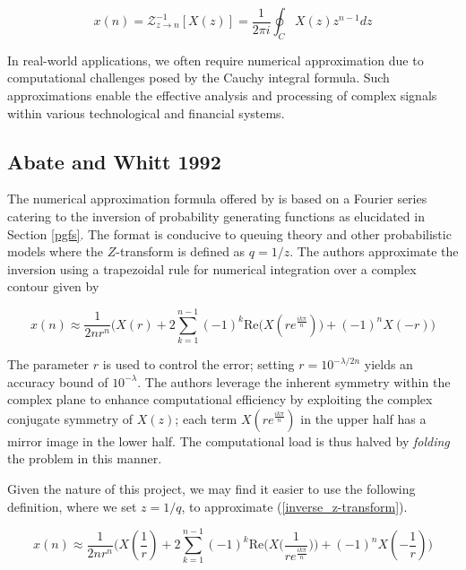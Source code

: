 \documentclass[a4paper]{report}
\begin{document}
\begin{equation}\label{inverse_z-transform}
	x(n) = \mathcal{Z}^{-1}_{z \rightarrow n}[X(z)] = \frac{1}{2\pi i} \oint_C X(z)z^{n-1}dz
\end{equation}

In real-world applications, we often require numerical approximation due to computational challenges posed by the Cauchy integral formula. Such approximations enable the effective analysis and processing of complex signals within various technological and financial systems.
\newline
{}

\subsection{Abate and Whitt 1992}
The numerical approximation formula offered by \citet{AbateWhitt1992a, AbateWhitt1992b} is based on a Fourier series catering to the inversion of probability generating functions as elucidated in Section \ref{pgfs}. The format is conducive to queuing theory and other probabilistic models where the $Z$-transform is defined as $q = 1 / z$. The authors approximate the inversion using a trapezoidal rule for numerical integration over a complex contour given by

\begin{equation}\label{aw_inversion_original}
	x(n) \approx \frac{1}{2nr^n} \biggr( X(r) + 2\sum^{n-1}_{k = 1} (-1)^k \mathrm{Re}\bigg( X(re^{\frac{ik\pi}{n}})\bigg) + (-1)^nX(-r) \biggl)
\end{equation}

The parameter $r$ is used to control the error; setting $r = 10^{-\lambda / 2n}$ yields an accuracy bound of $10^{-\lambda}$. The authors leverage the inherent symmetry within the complex plane to enhance computational efficiency by exploiting the complex conjugate symmetry of $X(z)$; each term $X(re^{\frac{ik\pi}{n}})$ in the upper half has a mirror image in the lower half. The computational load is thus halved by \textit{folding} the problem in this manner.

Given the nature of this project, we may find it easier to use the following definition, where we set $z = 1 / q$, to approximate (\ref{inverse_z-transform}).

\begin{equation}\label{aw_inversion}
	x(n) \approx \frac{1}{2nr^n} \biggr( X(\frac{1}{r}) + 2\sum^{n-1}_{k = 1} (-1)^k \text{Re}\bigg( X\big(\frac{1}{re^{\frac{ik\pi}{n}}}\big)\bigg) + (-1)^nX(-\frac{1}{r}) \biggl)
\end{equation}
\end{document}
